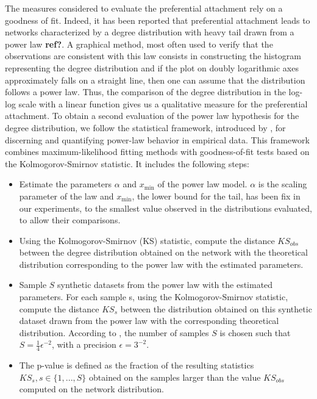 \documentclass[a4paper, 12pt]{article}
\begin{document}
The measures considered to evaluate the preferential attachment rely on a goodness of fit. Indeed, it has been reported that preferential attachment leads to networks characterized by a degree distribution with heavy tail drawn from a power law \textbf{ref?}. A graphical method, most often used to verify that the observations are consistent with this law  consists in constructing the histogram representing the degree distribution and if the plot on doubly logarithmic axes approximately falls on a straight line, then one can assume that the distribution follows a power law. Thus, the comparison of the degree distribution in the log-log scale with a linear function gives us a qualitative measure for the preferential attachment. To obtain a second evaluation of the power law hypothesis for the degree distribution, we follow the statistical framework, introduced by \cite{clauset2009power}, for discerning and quantifying power-law behavior in empirical data. This framework combines maximum-likelihood fitting methods with goodness-of-fit tests based on the Kolmogorov-Smirnov statistic. It includes the following steps:


\begin{itemize}
	\item Estimate the parameters $\alpha$ and $x_\text{min}$ of the power law model. $\alpha$ is the scaling parameter of the law and $x_\text{min}$, the lower bound for the tail,  has been fix in our experiments, to the smallest value observed in the distributions evaluated, to allow their comparisons.
	\item  Using the Kolmogorov-Smirnov (KS) statistic, compute the distance $KS_{obs}$  between the degree distribution obtained on the network with the theoretical distribution corresponding to the power law with the estimated parameters.
	\item Sample $S$ synthetic datasets from the power law with the estimated parameters. For each sample s, using the Kolmogorov-Smirnov statistic, compute the distance $KS_{s}$ between the distribution obtained on this synthetic dataset drawn from the power law with the corresponding theoretical distribution. According to  \cite{clauset2009power}, the number of samples $S$ is chosen such that $S = \frac{1}{4}\epsilon^{-2}$, with a precision  $\epsilon = 3^{-2}$. 
    \item  The p-value is defined as the fraction of  the resulting statistics $KS_s, s \in \{1,...,S\}$ obtained on the samples larger than the value $KS_{obs}$ computed on the network distribution.  
\end{itemize}
\end{document}
